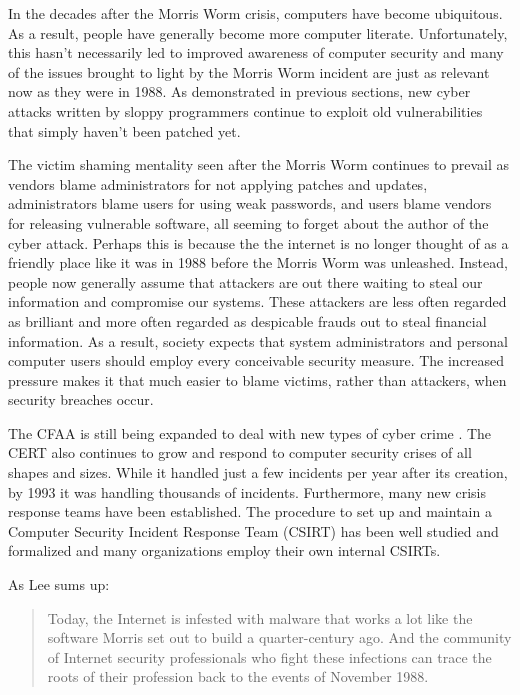 In the decades after the Morris Worm crisis, computers have become ubiquitous.
As a result, people have generally become more computer literate. Unfortunately,
this hasn't necessarily led to improved awareness of computer security and many of the
issues brought to light by the Morris Worm incident are just as relevant now as
they were in 1988. As demonstrated in previous sections, new cyber attacks
written by sloppy programmers continue to exploit old vulnerabilities that
simply haven't been patched yet.

The victim shaming mentality seen after the Morris Worm continues
to prevail as vendors blame administrators for not applying patches and
updates, administrators blame users for using weak passwords, and users blame
vendors for releasing vulnerable software, all seeming to forget about the
author of the cyber attack. Perhaps this is because the the internet is no longer
thought of as a friendly place like it was in 1988 before the Morris Worm was
unleashed. Instead, people now generally assume that attackers are out there
waiting to steal our information and compromise our systems.
These attackers are less often regarded as brilliant and more often
regarded as despicable frauds out to steal financial information. As a
result, society expects that system administrators and personal computer users
should employ every conceivable security measure. The increased pressure makes
it that much easier to blame victims, rather than attackers, when security
breaches occur.

The CFAA is still being expanded to deal with new types of cyber crime
\cite{adams_controlling_1996}. The CERT also continues to grow and respond to
computer security crises of all shapes and sizes. While it handled just a few
incidents per year after its creation, by 1993 it was handling thousands of
incidents\cite{fithen_cert_1994}. Furthermore, many new crisis response teams
have been established. The procedure to set up and maintain a Computer
Security Incident Response Team (CSIRT) has been well studied and formalized
and many organizations employ their own internal CSIRTs. 

As Lee\cite{lee_washpost_2013} sums up:
\begin{quote}
Today, the Internet is infested with malware that works a lot like the software
Morris set out to build a quarter-century ago. And the community of Internet
security professionals who fight these infections can trace the roots of their
profession back to the events of November 1988.
\end{quote}
